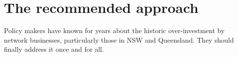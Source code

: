 \documentclass[FrontPage]{grattan}
\begin{document}




\section{The recommended approach}\label{sec:recommended-approach-causer-pays} 
Policy makers have known for years about the historic over-investment by network businesses, particularly those in NSW and Queensland. They should finally address it once and for all.
\end{document}
